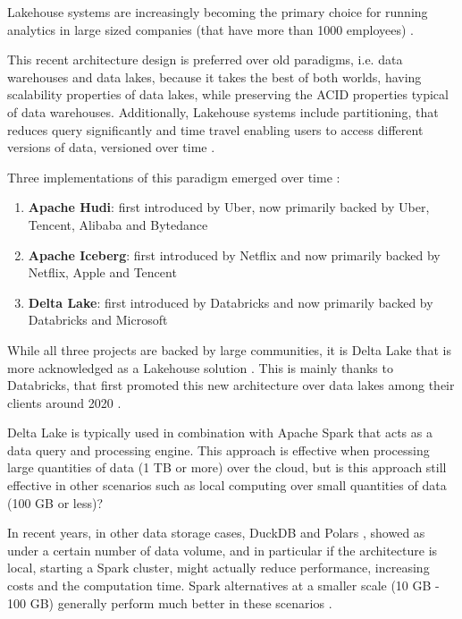 Lakehouse systems are increasingly becoming the primary choice for running analytics in large sized companies (that have more than 1000 employees) \cite{StateDataLakehouse2024}. 

This recent architecture design \cite{lakehouse2021} is preferred over old paradigms, i.e. data warehouses and data lakes, because it takes the best of both worlds, having scalability properties of data lakes, while preserving the \gls{ACID} properties typical of data warehouses. Additionally, Lakehouse systems include partitioning, that reduces query significantly and time travel enabling users to access different versions of data, versioned over time \cite{crociDataLakehouseHype2022}.

Three implementations of this paradigm emerged over time \cite{ApacheHudiVs}: 
\begin{enumerate}
    \item \textbf{Apache Hudi}: first introduced by Uber, now primarily backed by Uber, Tencent, Alibaba and Bytedance
    \item \textbf{Apache Iceberg}: first introduced by Netflix and now primarily backed by Netflix, Apple and Tencent
    \item \textbf{Delta Lake}: first introduced by Databricks and now primarily backed by Databricks and Microsoft
\end{enumerate}

While all three projects are backed by large communities, it is Delta Lake that is more acknowledged as a Lakehouse solution \cite{ApacheHudiVs}. This is mainly thanks to Databricks, that first promoted this new architecture over data lakes among their clients around 2020 \cite{armbrustDeltaLakeHighperformance2020}.

Delta Lake is typically used in combination with Apache Spark \cite{zahariaApacheSparkUnified2016} that acts as a data query and processing engine. This approach is effective when processing large quantities of data (1 TB or more) over the cloud, but is this approach still effective in other scenarios such as local computing over small quantities of data (100 GB or less)?

In recent years, in other data storage cases, DuckDB \cite{raasveldtDuckDBEmbeddableAnalytical2019} and Polars \cite{vinkWroteOneFastest2021}, showed as under a certain number of data volume, and in particular if the architecture is local, starting a Spark cluster, might actually reduce performance, increasing costs and the computation time. Spark alternatives at a smaller scale (10 GB - 100 GB) generally perform much better in these scenarios \cite{BenchmarkResultsSpark,ebergenUpdatesH2OAi2023}.

